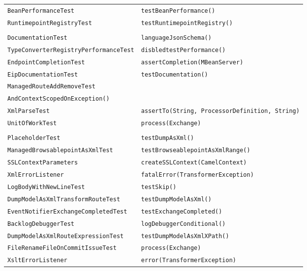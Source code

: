 \begin{center}
\begin{longtable}{ll}
\lstinline/BeanPerformanceTest/&{\lstinline/testBeanPerformance()/}\\
\lstinline/RuntimepointRegistryTest/&{\lstinline/testRuntimepointRegistry()/}\\
\raisebox{-13pt}{\shortstack{\lstinline/SimpleLanguageConfigurationAnd/-\\\lstinline/DocumentationTest/}}&{\lstinline/languageJsonSchema()/}\\
\lstinline/TypeConverterRegistryPerformanceTest/&{\lstinline/disbledtestPerformance()/}\\
\lstinline/EndpointCompletionTest/&{\lstinline/assertCompletion(MBeanServer)/}\\
\lstinline/EipDocumentationTest/&{\lstinline/testDocumentation()/}\\
\lstinline/ManagedRouteAddRemoveTest/&\raisebox{-13pt}{\shortstack{\lstinline/testRouteAddRemoteRouteWithRecipientList/-\\\lstinline/AndContextScopedOnException()/}}\\
\lstinline/XmlParseTest/&{\lstinline/assertTo(String, ProcessorDefinition, String)/}\\
\lstinline/UnitOfWorkTest/&{\lstinline/process(Exchange)/}\\
\raisebox{-13pt}{\shortstack{\lstinline/ManagedRouteDumpRouteAsXml/-\\\lstinline/PlaceholderTest/}}&{\lstinline/testDumpAsXml()/}\\
\lstinline/ManagedBrowsablepointAsXmlTest/&{\lstinline/testBrowseablepointAsXmlRange()/}\\
\lstinline/SSLContextParameters/&{\lstinline/createSSLContext(CamelContext)/}\\
\lstinline/XmlErrorListener/&{\lstinline/fatalError(TransformerException)/}\\
\lstinline/LogBodyWithNewLineTest/&{\lstinline/testSkip()/}\\
\lstinline/DumpModelAsXmlTransformRouteTest/&{\lstinline/testDumpModelAsXml()/}\\
\lstinline/EventNotifierExchangeCompletedTest/&{\lstinline/testExchangeCompleted()/}\\
\lstinline/BacklogDebuggerTest/&{\lstinline/logDebuggerConditional()/}\\
\lstinline/DumpModelAsXmlRouteExpressionTest/&{\lstinline/testDumpModelAsXmlXPath()/}\\
\lstinline/FileRenameFileOnCommitIssueTest/&{\lstinline/process(Exchange)/}\\
\lstinline/XsltErrorListener/&{\lstinline/error(TransformerException)/}\\

\end{longtable}
\end{center}
